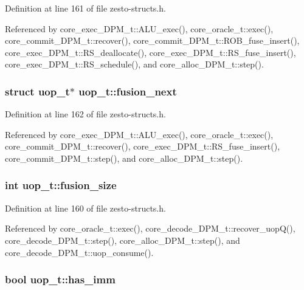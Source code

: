 Definition at line 161 of file zesto-structs.h.

Referenced by core\_\-exec\_\-DPM\_\-t::ALU\_\-exec(), core\_\-oracle\_\-t::exec(), core\_\-commit\_\-DPM\_\-t::recover(), core\_\-commit\_\-DPM\_\-t::ROB\_\-fuse\_\-insert(), core\_\-exec\_\-DPM\_\-t::RS\_\-deallocate(), core\_\-exec\_\-DPM\_\-t::RS\_\-fuse\_\-insert(), core\_\-exec\_\-DPM\_\-t::RS\_\-schedule(), and core\_\-alloc\_\-DPM\_\-t::step().
\subsubsection[{fusion\_\-next}]{\setlength{\rightskip}{0pt plus 5cm}struct {\bf uop\_\-t}$\ast$ {\bf uop\_\-t::fusion\_\-next}\hspace{0.3cm}{\tt  [read]}}\label{structuop__t_17e765e3d22399396fbe31aab97cdf06}




Definition at line 162 of file zesto-structs.h.

Referenced by core\_\-exec\_\-DPM\_\-t::ALU\_\-exec(), core\_\-oracle\_\-t::exec(), core\_\-commit\_\-DPM\_\-t::recover(), core\_\-exec\_\-DPM\_\-t::RS\_\-fuse\_\-insert(), core\_\-commit\_\-DPM\_\-t::step(), and core\_\-alloc\_\-DPM\_\-t::step().
\subsubsection[{fusion\_\-size}]{\setlength{\rightskip}{0pt plus 5cm}int {\bf uop\_\-t::fusion\_\-size}}\label{structuop__t_0691349116e499d26a2131a145fe8489}




Definition at line 160 of file zesto-structs.h.

Referenced by core\_\-oracle\_\-t::exec(), core\_\-decode\_\-DPM\_\-t::recover\_\-uopQ(), core\_\-decode\_\-DPM\_\-t::step(), core\_\-alloc\_\-DPM\_\-t::step(), and core\_\-decode\_\-DPM\_\-t::uop\_\-consume().
\subsubsection[{has\_\-imm}]{\setlength{\rightskip}{0pt plus 5cm}bool {\bf uop\_\-t::has\_\-imm}}\label{structuop__t_5f5acb91cf98e7630d1fff849c0458be}




